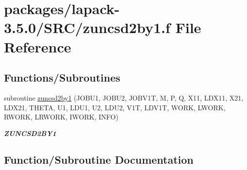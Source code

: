 \hypertarget{zuncsd2by1_8f}{}\section{packages/lapack-\/3.5.0/\+S\+R\+C/zuncsd2by1.f File Reference}
\label{zuncsd2by1_8f}
\subsection*{Functions/\+Subroutines}
\begin{DoxyCompactItemize}
\item 
subroutine \hyperlink{zuncsd2by1_8f_aebeed5aaf3ff49eaf0a3d1fd76701632}{zuncsd2by1} (J\+O\+B\+U1, J\+O\+B\+U2, J\+O\+B\+V1\+T, M, P, Q, X11, L\+D\+X11, X21, L\+D\+X21, T\+H\+E\+T\+A, U1, L\+D\+U1, U2, L\+D\+U2, V1\+T, L\+D\+V1\+T, W\+O\+R\+K, L\+W\+O\+R\+K, R\+W\+O\+R\+K, L\+R\+W\+O\+R\+K, I\+W\+O\+R\+K, I\+N\+F\+O)
\begin{DoxyCompactList}\small\item\em {\bfseries Z\+U\+N\+C\+S\+D2\+B\+Y1} \end{DoxyCompactList}\end{DoxyCompactItemize}


\subsection{Function/\+Subroutine Documentation}
\hypertarget{zuncsd2by1_8f_aebeed5aaf3ff49eaf0a3d1fd76701632}{}
